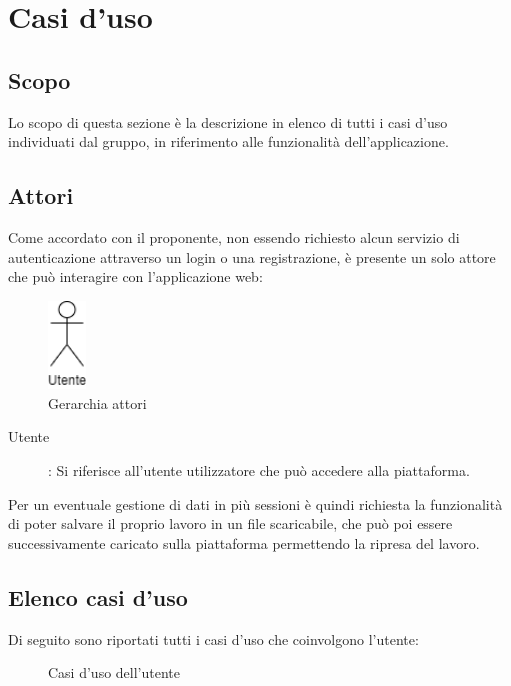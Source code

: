 \section{Casi d'uso}
\subsection{Scopo}
Lo scopo di questa sezione è la descrizione in elenco di tutti i casi d'uso individuati dal gruppo, in riferimento alle funzionalità dell'applicazione.
\subsection{Attori}
Come accordato con il proponente, non essendo richiesto alcun servizio di autenticazione attraverso un login o una registrazione, è presente un solo attore che può interagire con l'applicazione web:

\begin{figure}[h]
\includegraphics[width=1cm]{section/Images/Utente.png}
\centering
\caption{Gerarchia attori}
\end{figure}

\begin{description}
\item[Utente]:
Si riferisce all'utente utilizzatore che può accedere alla piattaforma.
\end{description}
Per un eventuale gestione di dati in più sessioni è quindi richiesta la funzionalità di poter salvare il proprio lavoro in un file scaricabile, che può poi essere successivamente caricato sulla piattaforma permettendo la ripresa del lavoro.
\subsection{Elenco casi d'uso}
Di seguito sono riportati tutti i casi d'uso che coinvolgono l'utente:
\begin{figure}[h]
\centering
\caption{Casi d'uso dell'utente}
\end{figure}











